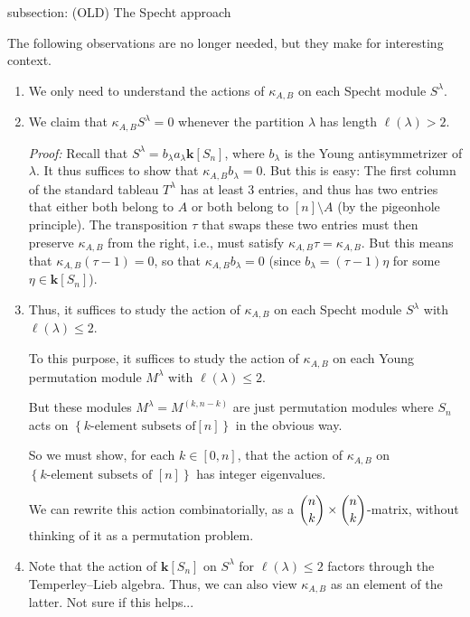 \documentclass[numbers=enddot,12pt,final,onecolumn,notitlepage]{scrartcl}%
\numberwithin{exer}{subsection}
\theoremstyle{definition}
\newenvironment{noncompile}{}{}
\begin{document}
\begin{noncompile}
subsection: (OLD) The Specht approach

The following observations are no longer needed, but they make for interesting context.

\begin{enumerate}
\item We only need to understand the actions of $\kappa_{A,B}$ on each Specht
module $S^{\lambda}$.

\item We claim that $\kappa_{A,B}S^{\lambda}=0$ whenever the partition
$\lambda$ has length $\ell\left(  \lambda\right)  >2$.

\textit{Proof:} Recall that $S^{\lambda}=b_{\lambda}a_{\lambda}\mathbf{k}%
\left[  S_{n}\right]  $, where $b_{\lambda}$ is the Young antisymmetrizer of
$\lambda$. It thus suffices to show that $\kappa_{A,B}b_{\lambda}=0$. But this
is easy: The first column of the standard tableau $T^{\lambda}$ has at least
$3$ entries, and thus has two entries that either both belong to $A$ or both
belong to $\left[  n\right]  \setminus A$ (by the pigeonhole principle). The
transposition $\tau$ that swaps these two entries must then preserve
$\kappa_{A,B}$ from the right, i.e., must satisfy $\kappa_{A,B}\tau
=\kappa_{A,B}$. But this means that $\kappa_{A,B}\left(  \tau-1\right)  =0$,
so that $\kappa_{A,B}b_{\lambda}=0$ (since $b_{\lambda}=\left(  \tau-1\right)
\eta$ for some $\eta\in\mathbf{k}\left[  S_{n}\right]  $).

\item Thus, it suffices to study the action of $\kappa_{A,B}$ on each Specht
module $S^{\lambda}$ with $\ell\left(  \lambda\right)  \leq2$.

To this purpose, it suffices to study the action of $\kappa_{A,B}$ on each
Young permutation module $M^{\lambda}$ with $\ell\left(  \lambda\right)
\leq2$.

But these modules $M^{\lambda}=M^{\left(  k,n-k\right)  }$ are just
permutation modules where $S_{n}$ acts on $\left\{  k\text{-element subsets of
}\left[  n\right]  \right\}  $ in the obvious way.

So we must show, for each $k\in\left[  0,n\right]  $, that the action of
$\kappa_{A,B}$ on $\left\{  k\text{-element subsets of }\left[  n\right]
\right\}  $ has integer eigenvalues.

We can rewrite this action combinatorially, as a $\dbinom{n}{k}\times
\dbinom{n}{k}$-matrix, without thinking of it as a permutation problem.

\item Note that the action of $\mathbf{k}\left[  S_{n}\right]  $ on
$S^{\lambda}$ for $\ell\left(  \lambda\right)  \leq2$ factors through the
Temperley--Lieb algebra. Thus, we can also view $\kappa_{A,B}$ as an element
of the latter. Not sure if this helps...
\end{enumerate}
\end{noncompile}
\end{document}
